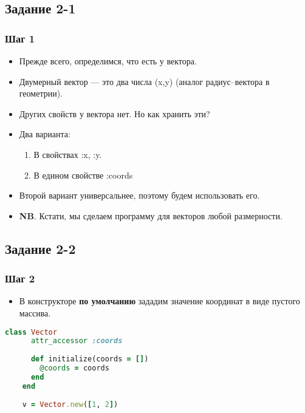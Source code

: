 \documentclass[compress,red]{beamer}
\begin{document}
\subsection{Задание 2-1}
\begin{frame}[fragile]
  \frametitle{Шаг 1}
  \begin{itemize}
    \item Прежде всего, определимся, что есть у вектора.
    \item Двумерный вектор --- это два числа (x,y) (аналог радиус--вектора в геометрии).
    \item Других свойств у вектора нет. Но как хранить эти?
    \item Два варианта:
      \begin{enumerate}
        \item В свойствах :x, :y.
        \item В едином свойстве :coords
      \end{enumerate}
    \item Второй вариант универсальнее, поэтому будем использовать его.
    \item \textbf{NB}. Кстати, мы сделаем программу для векторов любой размерности.
  \end{itemize}
\end{frame}

\subsection{Задание 2-2}
\begin{frame}[fragile]
  \frametitle{Шаг 2}
  \begin{itemize}
    \item В конструкторе \textbf{по умолчанию} зададим значение координат в виде пустого массива.
  \end{itemize}
  \scriptsize{
  \begin{lstlisting}[language=ruby,basicstyle=\footnotesize,label=ruby12,caption=Vector]
    class Vector
      attr_accessor :coords
      
      def initialize(coords = [])
        @coords = coords
      end
    end
    
    v = Vector.new([1, 2])
  \end{lstlisting}
  }
\end{frame}
\end{document}
